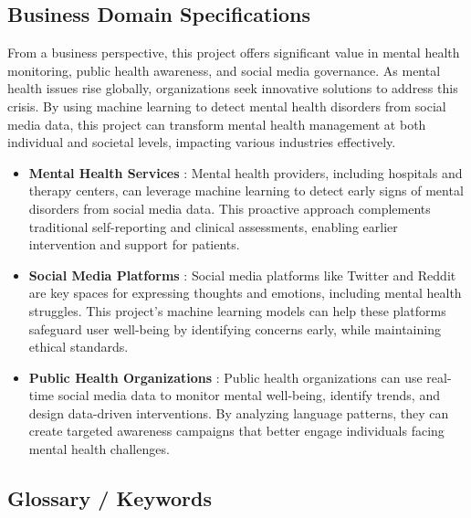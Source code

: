 \subsection{Business Domain Specifications}
\noindent
From a business perspective, this project offers significant value in mental health monitoring, public health awareness, and social media governance. As mental health issues rise globally, organizations seek innovative solutions to address this crisis. By using machine learning to detect mental health disorders from social media data, this project can transform mental health management at both individual and societal levels, impacting various industries effectively.

\begin{itemize}
    
    \item \textbf{Mental Health Services} :
    \noindent
    Mental health providers, including hospitals and therapy centers, can leverage machine learning to detect early signs of mental disorders from social media data. This proactive approach complements traditional self-reporting and clinical assessments, enabling earlier intervention and support for patients.

    \item \textbf{Social Media Platforms} :
    \noindent
    Social media platforms like Twitter and Reddit are key spaces for expressing thoughts and emotions, including mental health struggles. This project’s machine learning models can help these platforms safeguard user well-being by identifying concerns early, while maintaining ethical standards.

    \item \textbf{Public Health Organizations} :
    \noindent
    Public health organizations can use real-time social media data to monitor mental well-being, identify trends, and design data-driven interventions. By analyzing language patterns, they can create targeted awareness campaigns that better engage individuals facing mental health challenges.
    
\end{itemize}


\subsection{Glossary / Keywords}
\noindent

